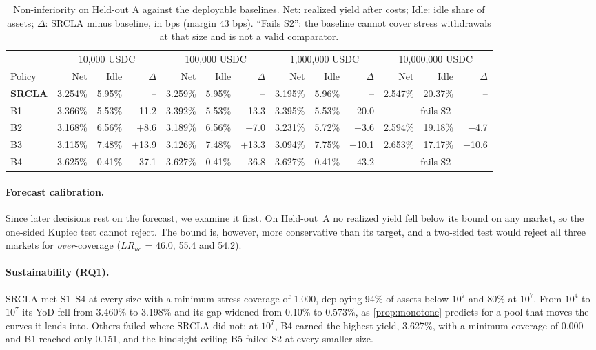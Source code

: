 \documentclass[sigconf]{acmart}
\begin{document}
\begin{table}[t]
\caption{Non-inferiority on Held-out A against the deployable baselines. Net: realized yield after costs; Idle: idle share of assets; $\Delta$: SRCLA minus baseline, in bps (margin 43 bps). ``Fails S2'': the baseline cannot cover stress withdrawals at that size and is not a valid comparator.}
\label{tab:noninf}
\centering
\small
\setlength{\tabcolsep}{4pt}
\begin{tabular}{l rrr rrr rrr rrr}
\toprule
 & \multicolumn{3}{c}{10,000 USDC} & \multicolumn{3}{c}{100,000 USDC} & \multicolumn{3}{c}{1,000,000 USDC} & \multicolumn{3}{c}{10,000,000 USDC} \\
\cmidrule(lr){2-4}\cmidrule(lr){5-7}\cmidrule(lr){8-10}\cmidrule(lr){11-13}
Policy & Net & Idle & $\Delta$ & Net & Idle & $\Delta$ & Net & Idle & $\Delta$ & Net & Idle & $\Delta$ \\
\midrule
\textbf{SRCLA} & 3.254\% & 5.95\% & -- & 3.259\% & 5.95\% & -- & 3.195\% & 5.96\% & -- & 2.547\% & 20.37\% & -- \\
B1 & 3.366\% & 5.53\% & $-$11.2 & 3.392\% & 5.53\% & $-$13.3 & 3.395\% & 5.53\% & $-$20.0 & \multicolumn{3}{c}{fails S2} \\
B2 & 3.168\% & 6.56\% & $+$8.6 & 3.189\% & 6.56\% & $+$7.0 & 3.231\% & 5.72\% & $-$3.6 & 2.594\% & 19.18\% & $-$4.7 \\
B3 & 3.115\% & 7.48\% & $+$13.9 & 3.126\% & 7.48\% & $+$13.3 & 3.094\% & 7.75\% & $+$10.1 & 2.653\% & 17.17\% & $-$10.6 \\
B4 & 3.625\% & 0.41\% & $-$37.1 & 3.627\% & 0.41\% & $-$36.8 & 3.627\% & 0.41\% & $\mathbf{-43.2}$ & \multicolumn{3}{c}{fails S2} \\
\bottomrule
\end{tabular}
\end{table}

\paragraph{Forecast calibration.}
Since later decisions rest on the forecast, we examine it first. On Held-out~A no realized yield fell below its bound on any market, so the one-sided Kupiec test cannot reject. The bound is, however, more conservative than its target, and a two-sided test would reject all three markets for \emph{over}-coverage ($LR_{uc}$ = 46.0, 55.4 and 54.2).

\paragraph{Sustainability (RQ1).}
SRCLA met S1--S4 at every size with a minimum stress coverage of 1.000, deploying 94\% of assets below $10^7$ and 80\% at $10^7$. From $10^4$ to $10^7$ its YoD fell from 3.460\% to 3.198\% and its gap widened from 0.10\% to 0.573\%, as \cref{prop:monotone} predicts for a pool that moves the curves it lends into. Others failed where SRCLA did not: at $10^7$, B4 earned the highest yield, 3.627\%, with a minimum coverage of 0.000 and B1 reached only 0.151, and the hindsight ceiling B5 failed S2 at every smaller size.
\end{document}
